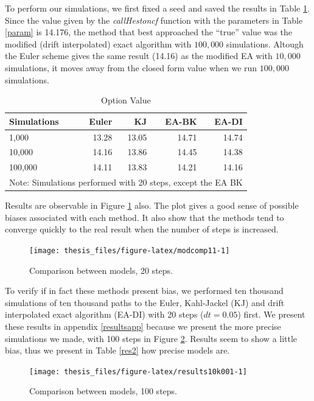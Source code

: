 \documentclass[12pt,twoside]{reedthesis}
\theoremstyle{definition}
\theoremstyle{definition}
\theoremstyle{remark}
\begin{document}
  To perform our simulations, we first fixed a seed and saved the results
  in Table \ref{res}. Since the value given by the \emph{callHestoncf}
  function with the parameters in Table \ref{param} is 14.176, the method
  that best approached the ``true'' value was the modified (drift
  interpolated) exact algorithm with \(100,000\) simulations. Altough the
  Euler scheme gives the same result (14.16) as the modified EA with
  \(10,000\) simulations, it moves away from the closed form value when we
  run \(100,000\) simulations.
  \begin{table}[ht]
  \centering
  \begin{tabular}{lrrrr}
    \hline 
  Simulations & Euler & KJ & EA-BK & EA-DI \\ 
    \hline 
  1,000 & 13.28 & 13.05 & 14.71 & 14.74 \\ 
    10,000 & 14.16 & 13.86 & 14.45 & 14.38 \\ 
    100,000 & 14.11 & 13.83 & 14.21 & 14.16 \\ 
     \hline 
  \multicolumn{5}{l}{\scriptsize{Note: Simulations performed with 20 steps, except the EA BK}} 
  \end{tabular}
  \caption{Option Value} 
  \label{res}
  \end{table}
  Results are observable in Figure \ref{fig:modcomp11} also. The plot
  gives a good sense of possible biases associated with each method. It
  also show that the methods tend to converge quickly to the real result
  when the number of steps is increased.
  \begin{figure}
  
  {\centering \texttt{[image: thesis\_files/figure-latex/modcomp11-1]} 
  
  }
  
  \caption{Comparison between models, 20 steps. \label{modcomp1}}\label{fig:modcomp11}
  \end{figure}
  To verify if in fact these methods present bias, we performed ten
  thousand simulations of ten thousand paths to the Euler, Kahl-Jackel
  (KJ) and drift interpolated exact algorithm (EA-DI) with 20 steps
  (\(dt = 0.05\)) first. We present these results in appendix
  \ref{resultsapp} because we present the more precise simulations we
  made, with 100 steps in Figure \ref{fig:results10k001}. Results seem to
  show a little bias, thus we present in Table \ref{res2} how precise
  models are.
  \begin{figure}
  
  {\centering \texttt{[image: thesis\_files/figure-latex/results10k001-1]} 
  
  }
  
  \caption{Comparison between models, 100 steps. \label{results10k001}}\label{fig:results10k001}
  \end{figure}
\end{document}
